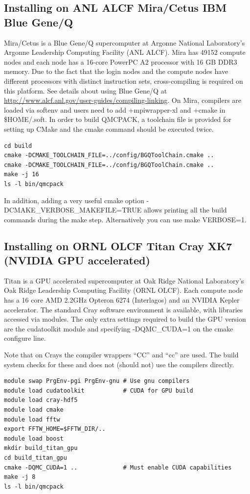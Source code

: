 \subsection{Installing on ANL ALCF Mira/Cetus IBM Blue Gene/Q}
\label{sec:buildbgq}
Mira/Cetus is a Blue Gene/Q supercomputer at Argonne National Laboratory's Argonne Leadership Computing Facility (ANL ALCF). Mira has 49152 compute nodes and each node has a 16-core PowerPC A2 processor with 16 GB DDR3 memory. Due to the fact that the login nodes and the compute nodes have different processors with distinct instruction sets, cross-compiling is required on this platform. See details about using Blue Gene/Q at \url{http://www.alcf.anl.gov/user-guides/compiling-linking}. On Mira, compilers are loaded via softenv and users need to add +mpiwrapper-xl and +cmake in \$HOME/.soft. In order to build QMCPACK, a toolchain file is provided for setting up CMake and the cmake command should be executed twice.

\begin{verbatim}
cd build
cmake -DCMAKE_TOOLCHAIN_FILE=../config/BGQToolChain.cmake ..
cmake -DCMAKE_TOOLCHAIN_FILE=../config/BGQToolChain.cmake ..
make -j 16
ls -l bin/qmcpack
\end{verbatim}

In addition, adding a very useful cmake option
-DCMAKE\_VERBOSE\_MAKEFILE=TRUE allows printing all the build commands
during the make step. Alternatively you can use make VERBOSE=1.

\subsection{Installing on ORNL OLCF Titan Cray XK7 (NVIDIA GPU
  accelerated)}
\label{sec:titanbuildgpu}
Titan is a GPU accelerated supercomputer at Oak Ridge National
Laboratory's  Oak Ridge Leadership Computing Facility  (ORNL OLCF). Each
compute node has a 16 core AMD 2.2GHz Opteron 6274 (Interlagos) and an
NVIDIA Kepler accelerator. The standard Cray software environment is
available, with libraries accessed via modules. The only extra
settings required to build the GPU version are the cudatoolkit module
and specifying -DQMC\_CUDA=1 on the cmake configure line.

Note that on Crays the compiler wrappers ``CC'' and ``cc'' are 
used. The build system checks for these and does not (should not) use
the compilers directly.

\begin{verbatim}
module swap PrgEnv-pgi PrgEnv-gnu # Use gnu compilers
module load cudatoolkit           # CUDA for GPU build
module load cray-hdf5
module load cmake
module load fftw
export FFTW_HOME=$FFTW_DIR/..
module load boost
mkdir build_titan_gpu
cd build_titan_gpu
cmake -DQMC_CUDA=1 ..             # Must enable CUDA capabilities
make -j 8
ls -l bin/qmcpack 
\end{verbatim}

